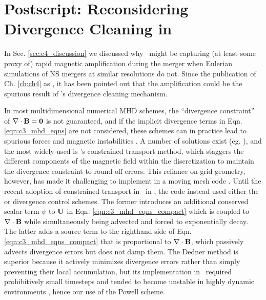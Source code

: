 \section{Postscript: Reconsidering Divergence Cleaning in \arepo}
\label{sec:c4_postscript}

In Sec. \ref{sec:c4_discussion} we discussed why \arepo\ might be capturing (at least some proxy of) rapid magnetic amplification during the merger when Eulerian simulations of NS mergers at similar resolutions do not.  Since the publication of Ch. \ref{ch:ch4} as \cite{zhu+15}, it has been pointed out that the amplification could be the spurious result of \arepo's divergence cleaning mechanism.


In most multidimensional numerical MHD schemes, the ``divergence constraint'' of $\bf{\nabla\cdot B} = 0$ is not guaranteed, and if the implicit divergence terms in Eqn. \ref{eqn:c3_mhd_eqns} are not considered, these schemes can in practice lead to spurious forces and magnetic instabilities \citep{toth00, hopkr16}.  A number of solutions exist (eg. \citealt{toth00}), and the most widely-used is \cite{evanh88}'s constrained transport method, which staggers the different components of the magnetic field within the discretization to maintain the divergence constraint to round-off errors.  This reliance on grid geometry, however, has made it challenging to implement in a moving mesh code \citep{moczvh14}.  Until the recent adoption of constrained transport in \arepo\ in \cite{mocz+16}, the code instead used either the \cite{dedn+02} or \cite{powe+99} divergence control schemes.  The former introduces an additional conserved scalar term $\psi$ to ${\bf U}$ in Eqn. \ref{eqn:c3_mhd_eqns_compact} which is coupled to $\bf{\nabla\cdot B}$ while simultaneously being advected and forced to exponentially decay.  The latter adds a source term to the righthand side of Eqn. \ref{eqn:c3_mhd_eqns_compact} that is proportional to $\bf{\nabla\cdot B}$, which passively advects divergence errors but does not damp them.  The Dedner method is superior because it actively minimizes divergence errors rather than simply preventing their local accumulation, but its implementation in \arepo\ required prohibitively small timesteps and tended to become unstable in highly dynamic environments \citep{pakms13}, hence our use of the Powell scheme.

